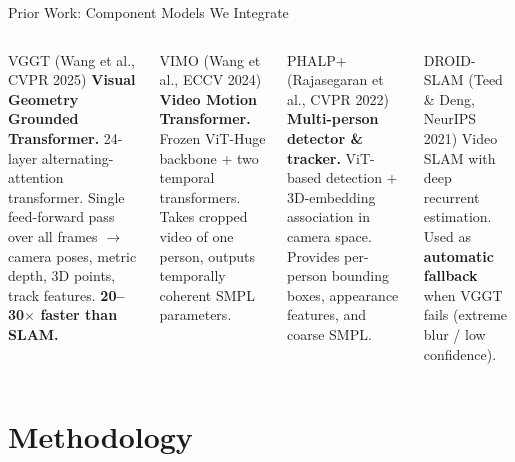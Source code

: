 \documentclass[aspectratio=169,11pt]{beamer}
\begin{document}
\begin{frame}{Prior Work: Component Models We Integrate}
  \begin{columns}[T]
      \begin{block}{VGGT \textnormal{\small (Wang et al., CVPR 2025)}}
        \small \textbf{Visual Geometry Grounded Transformer.}
        24-layer alternating-attention transformer. Single feed-forward pass over all frames $\to$ camera poses, metric depth, 3D points, track features. \textbf{20--30$\times$ faster than SLAM.}
      \end{block}
      \vspace{0.5em}
      \begin{block}{VIMO \textnormal{\small (Wang et al., ECCV 2024)}}
        \small \textbf{Video Motion Transformer.} Frozen ViT-Huge backbone + two temporal transformers. Takes cropped video of one person, outputs temporally coherent SMPL parameters.
      \end{block}
      \begin{block}{PHALP+ \textnormal{\small (Rajasegaran et al., CVPR 2022)}}
        \small \textbf{Multi-person detector \& tracker.}
        ViT-based detection + 3D-embedding association in camera space.
        Provides per-person bounding boxes, appearance features, and coarse SMPL.
      \end{block}
      \vspace{0.5em}
      \begin{block}{DROID-SLAM \textnormal{\small (Teed \& Deng, NeurIPS 2021)}}
        \small Video SLAM with deep recurrent estimation. Used as \textbf{automatic fallback} when VGGT fails (extreme blur / low confidence).
      \end{block}
  \end{columns}
\end{frame}

\section{Methodology}
\end{document}
